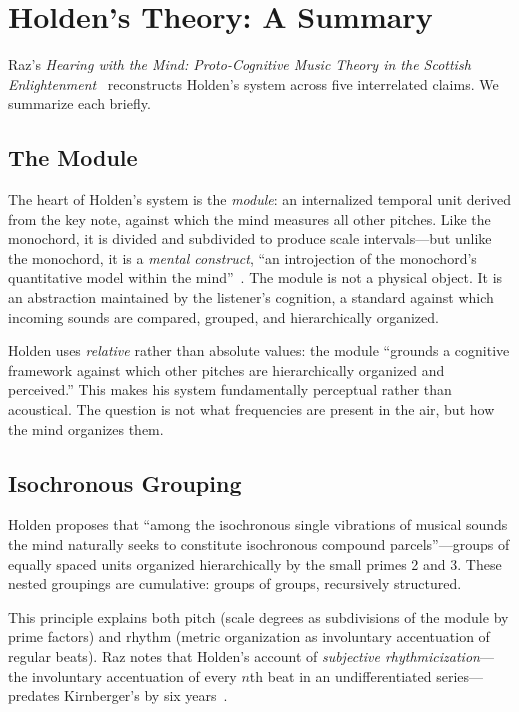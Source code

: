 \documentclass[10pt,letterpaper,twocolumn]{article}
\begin{document}
\section{Holden's Theory: A Summary}
\label{sec:holden}

Raz's \emph{Hearing with the Mind: Proto-Cognitive Music Theory in the Scottish Enlightenment}~\citep{raz2025} reconstructs Holden's system across five interrelated claims. We summarize each briefly.

\subsection{The Module}

The heart of Holden's system is the \emph{module}: an internalized temporal unit derived from the key note, against which the mind measures all other pitches. Like the monochord, it is divided and subdivided to produce scale intervals---but unlike the monochord, it is a \emph{mental construct}, ``an introjection of the monochord's quantitative model within the mind''~\citep{raz2025}. The module is not a physical object. It is an abstraction maintained by the listener's cognition, a standard against which incoming sounds are compared, grouped, and hierarchically organized.

Holden uses \emph{relative} rather than absolute values: the module ``grounds a cognitive framework against which other pitches are hierarchically organized and perceived.'' This makes his system fundamentally perceptual rather than acoustical. The question is not what frequencies are present in the air, but how the mind organizes them.

\subsection{Isochronous Grouping}

Holden proposes that ``among the isochronous single vibrations of musical sounds the mind naturally seeks to constitute isochronous compound parcels''---groups of equally spaced units organized hierarchically by the small primes 2 and 3. These nested groupings are cumulative: groups of groups, recursively structured.

This principle explains both pitch (scale degrees as subdivisions of the module by prime factors) and rhythm (metric organization as involuntary accentuation of regular beats). Raz notes that Holden's account of \emph{subjective rhythmicization}---the involuntary accentuation of every $n$th beat in an undifferentiated series---predates Kirnberger's by six years~\citep{raz2025}.
\end{document}
